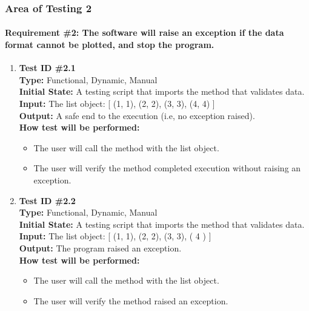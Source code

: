 \documentclass[12pt, titlepage]{article}
\begin{document}
\subsubsection{Area of Testing 2}		
	\paragraph{Requirement \#2: The software will raise an exception if the data format cannot be plotted, and stop the program.}
		\begin{enumerate}
			\item{\textbf{Test ID \#2.1\\}}
			\textbf{Type:} Functional, Dynamic, Manual\\
			\textbf{Initial State:} A testing script that imports the method that validates data. \\
			\textbf{Input:} The list object: [ (1, 1),  (2, 2), (3, 3), (4, 4) ]\\
			\textbf{Output:}  A safe end to the execution (i.e, no exception raised). \\
			\textbf{How test will be performed:}
				\begin{itemize}[label={--}]
					\item The user will call the method with the list object.
					\item The user will verify the method completed execution without raising an exception.
				\end{itemize}
					
			\item{\textbf{Test ID \#2.2\\}}
			\textbf{Type:} Functional, Dynamic, Manual\\
			\textbf{Initial State:} A testing script that imports the method that validates data.\\
			\textbf{Input:} The list object: [ (1, 1),  (2, 2), (3, 3), ( 4 ) ]\\
			\textbf{Output:} The program raised an exception.\\
			\textbf{How test will be performed:}
				\begin{itemize}[label={--}]
					\item The user will call the method with the list object.
					\item The user will verify the method raised an exception.
				\end{itemize}
									

\end{enumerate}
\end{document}
